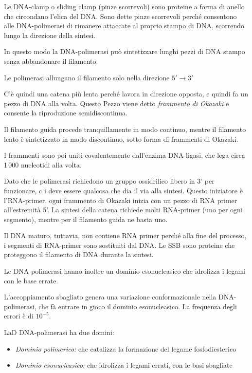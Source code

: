 Le DNA-clamp o sliding clamp (pinze scorrevoli) sono proteine a forma di anello che circondano l'elica del DNA. Sono dette pinze scorrevoli perché consentono alle DNA-polimerasi di rimanere attaccate al proprio stampo di DNA, scorrendo lungo la direzione della sintesi.

In questo modo la DNA-polimerasi può sintetizzare lunghi pezzi di DNA stampo senza abbandonare il filamento.

Le polimerasi allungano il filamento solo nella direzione $5' \to 3'$


C'è quindi una catena più lenta perché lavora in direzione opposta, e quindi fa un pezzo di DNA alla volta. Questo Pezzo viene detto \emph{frammento di Okazaki} e consente la riproduzione semidiscontinua.

Il filamento guida procede tranquillamente in modo continuo, mentre il filamento lento è sintetizzato in modo discontinuo, sotto forma di frammenti di Okazaki.

I frammenti sono poi uniti covalentemente dall'enzima DNA-ligasi, che lega circa 1\,000 nucleotidi alla volta.

Dato che le polimerasi richiedono un gruppo ossidrilico libero in 3' per funzionare, c i deve essere qualcosa che dia il via alla sintesi. Questo iniziatore è l'RNA-primer, ogni frammento di Okazaki inizia con un pezzo di RNA primer all'estremità 5'. La sintesi della catena richiede molti RNA-primer (uno per ogni segmento), mentre per il filamento guida ne basta uno.

Il DNA maturo, tuttavia, non contiene RNA primer perché alla fine del processo, i segmenti di RNA-primer sono sostituiti dal DNA. Le SSB sono proteine che proteggono il filamento di DNA durante la sintesi.

Le DNA polimerasi hanno inoltre un dominio esonucleasico che idrolizza i legami con le base errate.

L'accoppiamento sbagliato genera una variazione conformazionale nella DNA-polimerasi, che fà entrare in gioco il dominio esonucleasico. La frequenza degli errori è di $10^{-5}$.

LaD DNA-polimerasi ha due domini:
\begin{itemize}
\item \emph{Dominio polimerico:} che catalizza la formazione del legame fosfodiesterico
\item \emph{Dominio esonucleasico:} che idrolizza i legami errati, con le basi sbagliate
\end{itemize}

